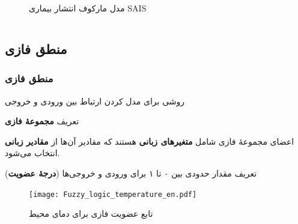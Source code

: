 \documentclass[xcolor=dvipsnames, professionalfonts, aspectratio=169, 11pt]{beamer}
\begin{document}
\begin{frame}
\begin{columns}[onlytextwidth]
\begin{column}{.5\textwidth}
\begin{figure}[ht]
                \caption{مدل مارکوف انتشار بیماری SAIS}
                \label{fig:SAIS}
            \end{figure}
        \end{column}
    \end{columns}

\end{frame}

\subsection{منطق فازی}
\begin{frame}[allowframebreaks]
    \frametitle{منطق فازی}

    \begin{moredi}
        \item روشی برای مدل کردن ارتباط بین ورودی و خروجی
        \item تعریف \textbf{مجموعهٔ فازی}
        \item اعضای مجموعهٔ فازی شامل \textbf{متغیرهای زبانی} هستند که مقادیر آن‌ها از \textbf{مقادیر زبانی} انتخاب می‌شود.
        \item تعریف مقدار حدودی بین ۰ تا ۱ برای ورودی و خروجی‌ها (\textbf{درجهٔ عضویت})
    \end{moredi}

    \begin{figure}[ht]
        \centering
        \texttt{[image: Fuzzy\_logic\_temperature\_en.pdf]}
        \caption{تابع عضویت فازی برای دمای محیط}
        \label{fig:fuzzy-logic-temperature}
    \end{figure}

\end{frame}
\end{document}
